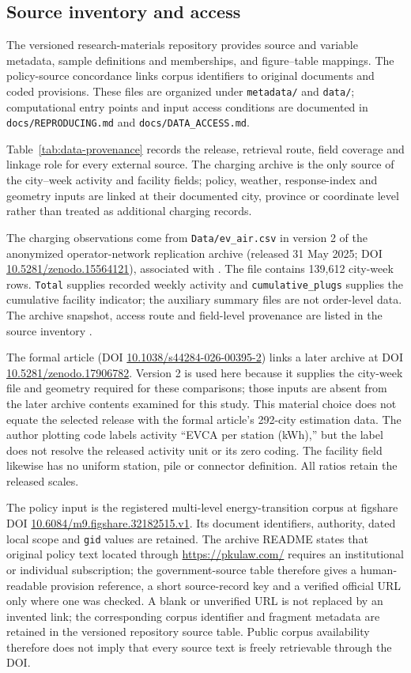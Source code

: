 \subsection{Source inventory and access}
The versioned research-materials repository \citep{gao2026materials} provides source and variable metadata, sample definitions and memberships, and figure--table mappings. The policy-source concordance links corpus identifiers to original documents and coded provisions. These files are organized under \texttt{metadata/} and \texttt{data/}; computational entry points and input access conditions are documented in \texttt{docs/REPRODUCING.md} and \texttt{docs/DATA\_ACCESS.md}.

Table~\ref{tab:data-provenance} records the release, retrieval route, field
coverage and linkage role for every external source.  The charging archive is
the only source of the city--week activity and facility fields; policy,
weather, response-index and geometry inputs are linked at their documented
city, province or coordinate level rather than treated as additional charging
records.


The charging observations come from \texttt{Data/ev\_air.csv} in version 2 of
the anonymized operator-network replication archive (released 31 May 2025;
DOI \url{10.5281/zenodo.15564121}), associated with \citet{ma2026}.  The file
contains 139,612 city-week rows.  \texttt{Total} supplies recorded weekly
activity and \texttt{cumulative\_plugs} supplies the cumulative facility
indicator; the auxiliary summary files are not order-level data.  The archive
snapshot, access route and field-level provenance are listed in the source
inventory \citep{evarchive2025}.

The formal article (DOI \url{10.1038/s44284-026-00395-2}) links a later archive at DOI \url{10.5281/zenodo.17906782}. Version 2 is used here because it supplies the city-week file and geometry required for these comparisons; those inputs are absent from the later archive contents examined for this study. This material choice does not equate the selected release with the formal article's 292-city estimation data. The author plotting code labels activity ``EVCA per station (kWh),'' but the label does not resolve the released activity unit or its zero coding. The facility field likewise has no uniform station, pile or connector definition. All ratios retain the released scales.

The policy input is the registered multi-level energy-transition corpus at
figshare DOI \url{10.6084/m9.figshare.32182515.v1}.  Its document identifiers,
authority, dated local scope and \texttt{gid} values are retained.  The archive
README states that original policy text located through
\url{https://pkulaw.com/} requires an institutional or individual subscription;
the government-source table therefore gives a human-readable provision
reference, a short source-record key and a verified official URL only where one
was checked.  A blank or unverified URL is not replaced by an invented link;
the corresponding corpus identifier and fragment metadata are retained in the
versioned repository source table.  Public corpus availability therefore does
not imply that every source text is freely retrievable through the DOI.

